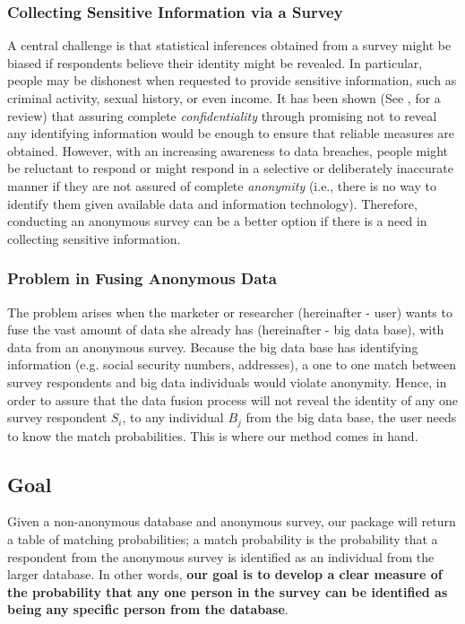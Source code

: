\subsubsection{Collecting Sensitive Information via a Survey}
A central challenge is that statistical inferences obtained from a survey might be biased if respondents believe their identity might be revealed. In particular, people may be dishonest when requested to provide sensitive information, such as criminal activity, sexual history, or even income. It has been shown (See \cite{RefWorks:7}, for a review) that assuring complete \textit{confidentiality} through promising not to reveal any identifying information would be enough to ensure that reliable measures are obtained. However, with an increasing awareness to data breaches, people might be reluctant to respond or might respond in a selective or deliberately inaccurate manner if they are not assured of complete \textit{anonymity} (i.e., there is no way to identify them given available data and information technology). Therefore, conducting an anonymous survey can be a better option if there is a need in collecting sensitive information.

\subsubsection{Problem in Fusing Anonymous Data}
The problem arises when the marketer or researcher (hereinafter - user) wants to fuse the vast amount of data she already has (hereinafter - big data base), with data from an anonymous survey.  Because the big data base has identifying information (e.g. social security numbers, addresses), a one to one match between survey respondents and big data individuals would violate anonymity.  Hence, in order to assure that the data fusion process will not reveal the identity of any one survey respondent $S_i$, to any individual $B_j$ from the big data base, the user needs to know the match probabilities. This is where our method comes in hand.

\subsection{Goal}
Given a non-anonymous database and anonymous survey, our package will return a table of matching probabilities; a match probability is the probability that a respondent from the anonymous survey is identified as an individual from the larger database. In other words, \textbf{our goal is to develop a clear measure of the probability that any one person in the survey can be identified as being any specific person from the database}. 

